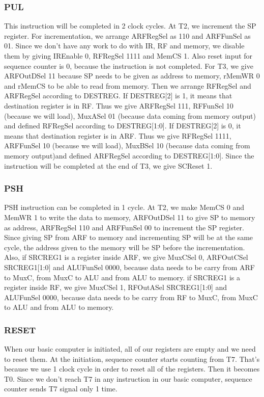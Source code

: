 \documentclass[pdftex,12pt,a4paper]{article}
\begin{document}
\subsubsection{PUL}
This instruction will be completed in 2 clock cycles. At T2, we increment the SP register. For incrementation, we arrange ARFRegSel as 110 and ARFFunSel as 01. Since we don't have any work to do with IR, RF and memory, we disable them by giving IREnable 0, RFRegSel 1111 and MemCS 1. Also reset input for sequence counter is 0, because the instruction is not completed. For T3, we give ARFOutDSel 11 because SP needs to be given as address to memory, rMemWR 0 and rMemCS to be able to read from memory. Then we arrange RFRegSel and ARFRegSel according to DESTREG. If DESTREG[2] is 1, it means that destination register is in RF. Thus we give ARFRegSel 111, RFFunSel 10 (because we will load), MuxASel 01 (because data coming from memory output) and defined RFRegSel according to DESTREG[1:0]. If DESTREG[2] is 0, it means that destination register is in ARF. Thus we give RFRegSel 1111, ARFFunSel 10 (because we will load), MuxBSel 10 (because data coming from memory output)and defined ARFRegSel according to DESTREG[1:0].
Since the instruction will be completed at the end of T3, we give SCReset 1.
\subsubsection{PSH}
PSH instruction can be completed in 1 cycle. At T2, we make MemCS 0 and MemWR 1 to write the data to memory, ARFOutDSel 11 to give SP to memory as address, ARFRegSel 110 and ARFFunSel 00 to increment the SP register. Since giving SP from ARF to memory and incrementing SP will be at the same cycle, the address given to the memory will be SP before the incrementation. Also, if SRCREG1 is a register inside ARF, we give MuxCSel 0, ARFOutCSel SRCREG1[1:0] and ALUFunSel 0000, because data needs to be carry from ARF to MuxC, from MuxC to ALU and from ALU to memory. if SRCREG1 is a register inside RF, we give MuxCSel 1, RFOutASel SRCREG1[1:0] and ALUFunSel 0000, because data needs to be carry from RF to MuxC, from MuxC to ALU and from ALU to memory.
\subsubsection{RESET}
When our basic computer is initiated, all of our registers are empty and we need to reset them. At the initiation, sequence counter starts counting from T7. That's because we use 1 clock cycle in order to reset all of the registers. Then it becomes T0. Since we don't reach T7 in any instruction in our basic computer, sequence counter sends T7 signal only 1 time.
\end{document}

